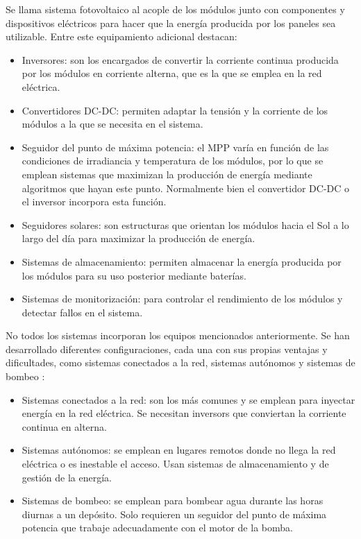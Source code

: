 Se llama \gls{sistema fotovoltaico} al acople de los módulos junto con componentes y dispositivos eléctricos para hacer que la energía producida por los paneles sea utilizable. Entre este equipamiento adicional destacan:

\begin{itemize}
      \item Inversores: son los encargados de convertir la corriente continua producida por los módulos en corriente alterna, que es la que se emplea en la red eléctrica.
      \item Convertidores DC-DC: permiten adaptar la tensión y la corriente de los módulos a la que se necesita en el sistema.
      \item Seguidor del punto de máxima potencia: el MPP varía en función de las condiciones de \gls{irradiancia} y temperatura de los módulos, por lo que se emplean sistemas que maximizan la producción de energía mediante algoritmos que hayan este punto. Normalmente bien el convertidor DC-DC o el inversor incorpora esta función.
      \item Seguidores solares: son estructuras que orientan los módulos hacia el Sol a lo largo del día para maximizar la producción de energía.
      \item Sistemas de almacenamiento: permiten almacenar la energía producida por los módulos para su uso posterior mediante baterías.
      \item Sistemas de monitorización: para controlar el rendimiento de los módulos y detectar fallos en el sistema.
\end{itemize}

No todos los sistemas incorporan los equipos mencionados anteriormente. Se han desarrollado diferentes configuraciones, cada una con sus propias ventajas y dificultades, como sistemas conectados a la red, \gls{sistemas autónomos} y \gls{sistemas de bombeo} \cite{Perpinan2020}:

\begin{itemize}
      \item Sistemas conectados a la red: son los más comunes y se emplean para inyectar energía en la red eléctrica. Se necesitan \glspl{inversor} que conviertan la corriente continua en alterna.
      \item Sistemas autónomos: se emplean en lugares remotos donde no llega la red eléctrica o es inestable el acceso. Usan \gls{sistemas de almacenamiento} y de gestión de la energía.
      \item Sistemas de bombeo: se emplean para bombear agua durante las horas diurnas a un depósito. Solo requieren un seguidor del punto de máxima potencia que trabaje adecuadamente con el motor de la bomba.
\end{itemize}


